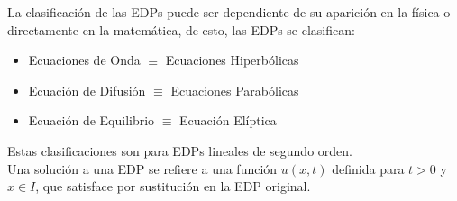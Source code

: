 La clasificación de las EDPs puede ser dependiente de su aparición en la física o directamente en la matemática, de esto, las EDPs se clasifican:
	\begin{itemize}
		\item Ecuaciones de Onda $\equiv$ Ecuaciones Hiperbólicas
		\item Ecuación de Difusión $\equiv$ Ecuaciones Parabólicas
		\item Ecuación de Equilibrio $\equiv$ Ecuación Elíptica
	\end{itemize}
Estas clasificaciones son para EDPs lineales de segundo orden. \\

Una solución a una EDP se refiere a una función $u(x,t)$ definida para $t > 0$ y $x\in I$, que satisface por sustitución en la EDP original.


















